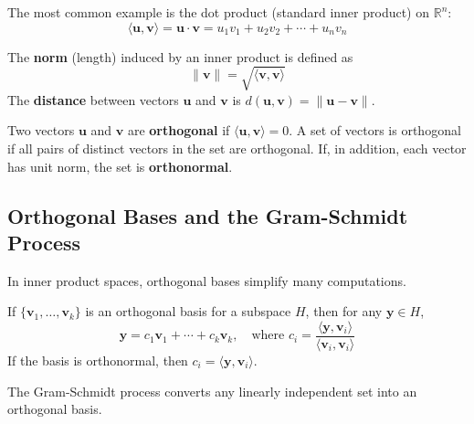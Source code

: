 The most common example is the dot product (standard inner product) on $\mathbb{R}^n$:
\[
\langle \mathbf{u}, \mathbf{v} \rangle = \mathbf{u} \cdot \mathbf{v} = u_1 v_1 + u_2 v_2 + \cdots + u_n v_n
\]

\begin{definition}
The \textbf{norm} (length) induced by an inner product is defined as
\[
\|\mathbf{v}\| = \sqrt{\langle \mathbf{v}, \mathbf{v} \rangle}
\]
The \textbf{distance} between vectors $\mathbf{u}$ and $\mathbf{v}$ is $d(\mathbf{u}, \mathbf{v}) = \|\mathbf{u} - \mathbf{v}\|$.
\end{definition}

\begin{definition}[Orthogonality]
Two vectors $\mathbf{u}$ and $\mathbf{v}$ are \textbf{orthogonal} if $\langle \mathbf{u}, \mathbf{v} \rangle = 0$. A set of vectors is orthogonal if all pairs of distinct vectors in the set are orthogonal. If, in addition, each vector has unit norm, the set is \textbf{orthonormal}.
\end{definition}

\subsection{Orthogonal Bases and the Gram-Schmidt Process}

In inner product spaces, orthogonal bases simplify many computations.

\begin{theorem}
If $\{\mathbf{v}_1, \ldots, \mathbf{v}_k\}$ is an orthogonal basis for a subspace $H$, then for any $\mathbf{y} \in H$,
\[
\mathbf{y} = c_1 \mathbf{v}_1 + \cdots + c_k \mathbf{v}_k, \quad \text{where } c_i = \frac{\langle \mathbf{y}, \mathbf{v}_i \rangle}{\langle \mathbf{v}_i, \mathbf{v}_i \rangle}
\]
If the basis is orthonormal, then $c_i = \langle \mathbf{y}, \mathbf{v}_i \rangle$.
\end{theorem}

The Gram-Schmidt process converts any linearly independent set into an orthogonal basis.

